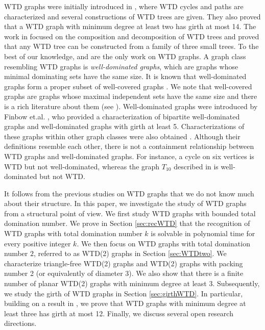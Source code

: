 \documentclass[11pt]{article}
\theoremstyle{definition}
\begin{document}
WTD graphs were initially introduced in \cite{HaRa97}, where WTD cycles and paths are characterized and several constructions of WTD trees are given. They also proved that a WTD graph with minimum degree at least two has girth at most 14. The work in \cite{FFV09} focused on the composition and decomposition of WTD trees and proved that any WTD tree can be constructed from a family of three small trees. To the best of our knowledge, \cite{HaRa97} and \cite{FFV09} are the only work on WTD graphs.
A graph class resembling WTD graphs is \emph{well-dominated graphs}, which are graphs whose minimal dominating sets have the same size. 
It is known that well-dominated graphs form a proper subset of well-covered graphs \cite{FHN88}. 
We note that well-covered graphs are graphs whose maximal independent sets have the same size and there is a rich literature about them (see \cite{Plu93, Har99}). 
Well-dominated graphs were introduced by Finbow et.al. \cite{FHN88}, who provided a characterization of bipartite well-dominated graphs and well-dominated graphs with girth at least 5. 
Characterizations of these graphs within other graph classes were also obtained \cite{ToVo90, GKS11, FiBo15, LeTa17}. 
Although their definitions resemble each other, there is not a containment relationship between WTD graphs and well-dominated graphs. 
For instance, a cycle on six vertices is WTD but not well-dominated, whereas the graph $T_{10}$ described in \cite{LeTa17} is well-dominated but not WTD.



It follows from the previous studies on WTD graphs that we do not know much about their structure. 
In this paper, we investigate the study of WTD graphs from a structural point of view. We first study WTD graphs with bounded total domination number. We prove in Section \ref{sec:recWTD} that the recognition of WTD graphs with total domination number $k$ is solvable in polynomial time for every positive integer $k$. We then focus on WTD graphs with total domination number $2$, referred to as WTD(2) graphs in Section \ref{sec:WTDtwo}. We characterize triangle-free WTD(2) graphs and WTD(2) graphs with packing number 2 (or equivalently of diameter 3). We also show that there is a finite number of planar WTD(2) graphs with minimum degree at least 3. Subsequently, we study the girth of WTD graphs in Section \ref{sec:girthWTD}. In particular, building on a result in \cite{HaRa97}, we prove that WTD graphs with minimum degree at least three has girth at most 12. Finally, we discuss several open research directions.
\end{document}
